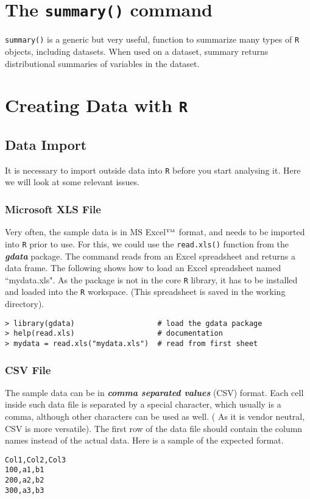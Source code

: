 \documentclass[a4paper,12pt]{article}
\begin{document}
\tableofcontents

\newpage



\section{The \texttt{summary()} command}
\texttt{summary()} is a generic but very useful, function to summarize many types of \texttt{R} objects, including datasets. When used on a dataset, summary returns distributional summaries of variables in the dataset.

\section{Creating Data with \texttt{R}}

\subsection{Data Import}
It is necessary to import outside data into \texttt{R} before you start analysing it. Here we will look at some relevant issues.

\subsubsection{Microsoft XLS File}
Very often, the sample data is in MS Excel$^{\mbox{\tiny{TM}}}$ format, and needs to be imported into \texttt{R} prior to use. For this, we could use the \texttt{read.xls()} function from the \textbf{\textit{gdata}} package. The command reads from an Excel spreadsheet and returns a data frame. The following shows how to load an Excel spreadsheet named ``mydata.xls". As the package is not in the core \texttt{R} library, it has to be installed and loaded into the \texttt{R} workspace. (This spreadsheet is saved in the working directory).
\begin{verbatim}
> library(gdata)                   # load the gdata package
> help(read.xls)                   # documentation
> mydata = read.xls("mydata.xls")  # read from first sheet
\end{verbatim}


\subsubsection{CSV File}
The sample data can be in \textit{\textbf{comma separated values}} (CSV) format. Each cell inside such data file is separated by a special character, which usually is a comma, although other characters can be used as well. ( As it is vendor neutral, CSV is more versatile).
The first row of the data file should contain the column names instead of the actual data. Here is a sample of the expected format.
\begin{verbatim}
Col1,Col2,Col3
100,a1,b1
200,a2,b2
300,a3,b3
\end{verbatim}
\end{document}
